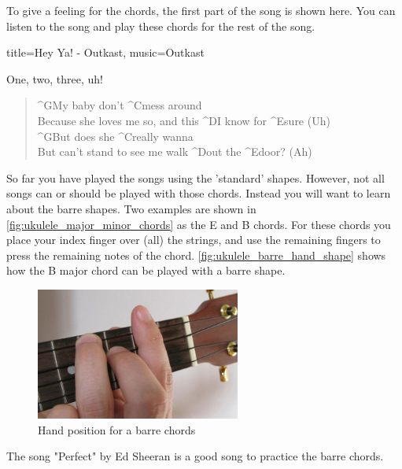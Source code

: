 To give a feeling for the chords, the first part of the song is shown here. You can listen to the song and play these chords for the rest of the song.

\begin{song}[verse/numbered, align-chords=l]{title={Hey Ya! - Outkast}, music={Outkast}}
	\begin{intro}
		One, two, three, uh!
	\end{intro}
	\begin{verse}
		^{G}My baby don't ^{C}mess around \\
		Because she loves me so, and this ^{D}I know for ^{E}sure (Uh) \\
		^{G}But does she ^{C}really wanna \\
		But can't stand to see me walk ^{D}out the ^{E}door? (Ah) \\
	\end{verse}
\end{song}

So far you have played the songs using the 'standard' shapes. However, not all songs can or should be played with those chords. Instead you will want to learn about the barre shapes. Two examples are shown in \autoref{fig:ukulele_major_minor_chords} as the E and B chords. For these chords you place your index finger over (all) the strings, and use the remaining fingers to press the remaining notes of the chord. \autoref{fig:ukulele_barre_hand_shape} shows how the B major chord can be played with a barre shape.

\begin{figure}[h]
	\centering
	\includegraphics[width=0.6\textwidth]{../../Images/ukulele-barre-hand-shape.jpg}
	\caption{Hand position for a barre chords \cite{BarreHandPositionUkulele}}
	\label{fig:ukulele_barre_hand_shape}
\end{figure}

\newpage

The song "Perfect" by Ed Sheeran is a good song to practice the barre chords.

